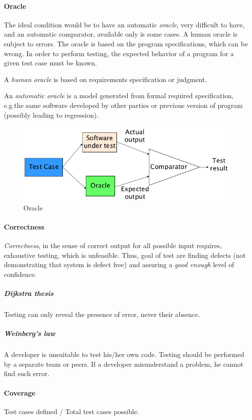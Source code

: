 \paragraph{Oracle}
The ideal condition would be to have an automatic \emph{oracle}, very difficult to have, and an automatic comparator, available only is some cases. A human oracle is subject to errors. The oracle is based on the program specifications, which can be wrong. In order to perform testing, the expected behavior of a program for a given test case must be known.

A \emph{human oracle} is based on requirements specification or judgment.

An \emph{automatic oracle} is a model generated from formal required specification, e.g.\@ the same software developed by other parties or previous version of program (possibly leading to regression).

\begin{figure}[hbtp]
\centering
\includegraphics[scale=0.35]{images/oracle.png}
\caption{Oracle}
\end{figure}

\paragraph{Correctness}
\emph{Correctness}, in the sense of correct output for all possible input requires, exhaustive testing, which is unfeasible. Thus, goal of test are finding defects (not demonstrating that system is defect free) and assuring a \emph{good enough} level of confidence.

\subparagraph{Dijkstra thesis} Testing can only reveal the presence of error, never their absence.

\subparagraph{Weinberg's law} A developer is unsuitable to test his/her own code. Testing should be performed by a separate team or peers. If a developer misunderstand a problem, he cannot find such error.

\paragraph{Coverage} Test cases defined / Total test cases possible.

